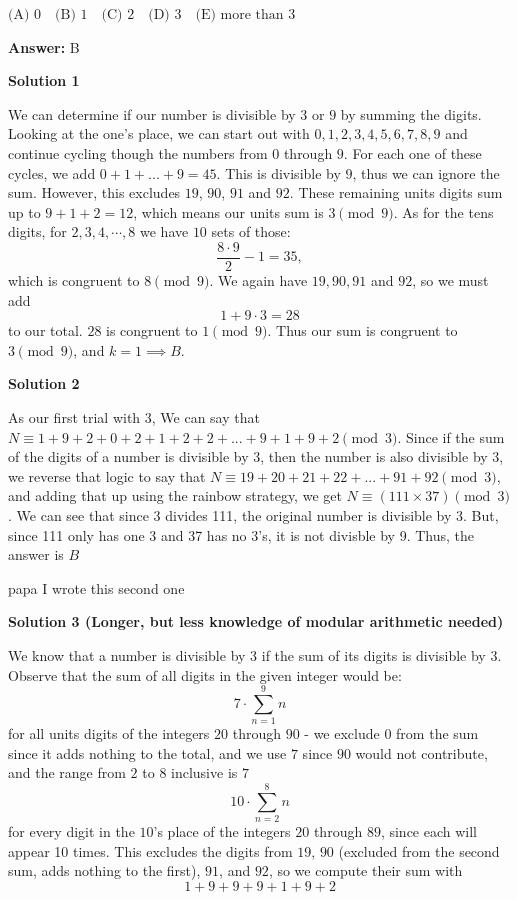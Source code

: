 \begin{enumerate}
 $\text{(A) } 0\quad \text{(B) } 1\quad \text{(C) } 2\quad \text{(D) } 3\quad \text{(E) more than } 3$

 \textbf{Answer: }B



\textbf{Solution 1}

We can determine if our number is divisible by $3$ or $9$ by summing the digits. Looking at the one's place, we can start out with $0, 1, 2, 3, 4, 5, 6, 7, 8, 9$ and continue cycling though the numbers from $0$ through $9$. For each one of these cycles, we add $0 + 1 + ... + 9 = 45$. This is divisible by $9$, thus we can ignore the sum. However, this excludes $19$, $90$, $91$ and $92$. These remaining units digits sum up to $9 + 1 + 2 = 12$, which means our units sum is $3 \pmod 9$. As for the tens digits, for $2, 3, 4, \cdots , 8$ we have $10$ sets of those: 
 \[\frac{8 \cdot 9}{2} - 1 = 35,\] which is congruent to $8 \pmod 9$. We again have $19, 90, 91$ and $92$, so we must add 
 \[1 + 9 \cdot 3 = 28\] to our total. $28$ is congruent to $1 \pmod 9$. Thus our sum is congruent to $3 \pmod 9$, and $k = 1  \implies \boxed{B}$.

 



\textbf{Solution 2}

As our first trial with 3, We can say that $N\equiv 1+9+2+0+2+1+2+2+...+9+1+9+2\pmod{3}$. Since if the sum of the digits of a number is divisible by 3, then the number is also divisible by 3, we reverse that logic to say that $N\equiv 19+20+21+22+...+91+92\pmod{3}$, and adding that up using the rainbow strategy, we get $N\equiv (111\times37)\pmod{3}$. We can see that since 3 divides 111, the original number is divisible by 3. But, since 111 only has one 3 and 37 has no 3's, it is not divisble by 9. Thus, the answer is $\boxed{B}$

 papa I wrote this second one

 


 



\textbf{Solution 3 (Longer, but less knowledge of modular arithmetic needed)}

We know that a number is divisible by $3$ if the sum of its digits is divisible by $3$. Observe that the sum of all digits in the given integer would be: 
 \[7 \cdot \sum_{n=1}^{9} n\] for all units digits of the integers $20$ through $90$ - we exclude $0$ from the sum since it adds nothing to the total, and we use $7$ since $90$ would not contribute, and the range from $2$ to $8$ inclusive is $7$
 \[10 \cdot \sum_{n=2}^{8} n\]   for every digit in the $10$'s place of the integers $20$ through $89$, since each will appear 10 times. This excludes the digits from $19$, $90$ (excluded from the second sum, adds nothing to the first), $91$, and $92$, so we compute their sum with 
 \[1+9+9+9+1+9+2\]


\end{enumerate}
